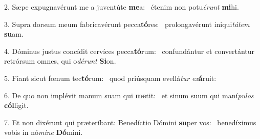 2. Sæpe expugnavérunt me a juventúte \textbf{me}a: \ast\  étenim non potu\textit{é}\textit{runt} \textbf{mi}hi.\

3. Supra dorsum meum fabricavérunt pecca\textbf{tó}res: \ast\  prolongavérunt iniqui\textit{tá}\textit{tem} \textbf{su}am.\

4. Dóminus justus concídit cervíces pecca\textbf{tó}rum: \ast\  confundántur et convertántur retrórsum omnes, qui o\textit{dé}\textit{runt} \textbf{Si}on.\

5. Fiant sicut fœnum tec\textbf{tó}rum: \ast\  quod priúsquam evellá\textit{tur} \textit{ex}\textbf{á}ruit:\

6. De quo non implévit manum suam qui \textbf{me}tit: \ast\  et sinum suum qui maní\textit{pu}\textit{los} \textbf{cól}ligit.\

7. Et non dixérunt qui præteríbant: Benedíctio Dómini \textbf{su}per vos: \ast\  benedíximus vobis in nó\textit{mi}\textit{ne} \textbf{Dó}mini.\

